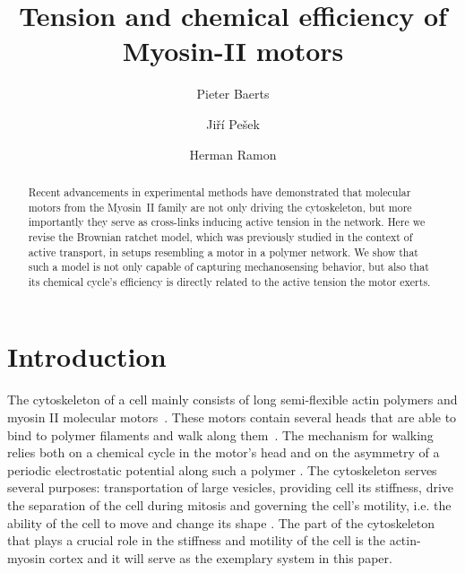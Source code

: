 \documentclass[aps,pre,twocolumn,showpacs,showkeys,superscriptaddress,floatfix]{revtex4-1}
\begin{document}
 

\title{Tension and chemical efficiency of Myosin-II motors}
\author{Pieter Baerts}
\author{Jiří Pešek}
\author{Herman Ramon}


\begin{abstract}
Recent advancements in experimental methods have demonstrated that molecular motors from the Myosin~II family are not only driving the cytoskeleton, 
but more importantly they serve as cross-links inducing active tension in the network. 
Here we revise the Brownian ratchet model, 
which was previously studied in the context of active transport, 
in setups resembling a motor in a polymer network.
We show that such a model is not only capable of capturing mechanosensing behavior,
but also that its chemical cycle's efficiency is directly related to the active tension the motor exerts. 
\end{abstract}

\maketitle 

\section{Introduction}
The cytoskeleton of a cell mainly consists of long semi-flexible actin polymers and myosin II molecular motors~\cite{mitchison1996actin}. 
These motors contain several heads that are able to bind to polymer filaments and walk along them~\cite{pollard1982structure}. 
The mechanism for walking relies both on a chemical cycle in the motor's head and on the asymmetry of a periodic electrostatic potential along such a polymer \cite{Reimann2002introduction}. 
The cytoskeleton serves several purposes: 
transportation of large vesicles, providing cell its stiffness, drive the separation of the cell during mitosis and governing the cell's motility, i.e. the ability of the cell to move and change its shape \cite{ross2008cargo,mitchison1996actin,rosenblatt2004myosin}.
The part of the cytoskeleton that plays a crucial role in the stiffness and motility of the cell is the actin-myosin cortex \cite{vicente2009non} and it will serve as the exemplary system in this paper.
\end{document}
